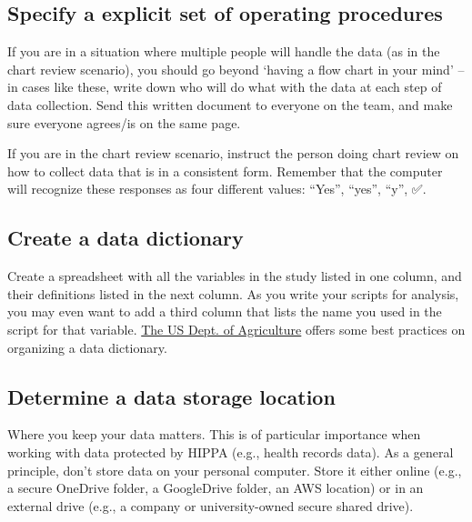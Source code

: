 \documentclass[
]{book}
\begin{document}
\hypertarget{specify-a-explicit-set-of-operating-procedures}{%
\subsection{Specify a explicit set of operating procedures}\label{specify-a-explicit-set-of-operating-procedures}}

If you are in a situation where multiple people will handle the data (as in the chart review scenario), you should go beyond `having a flow chart in your mind' -- in cases like these, write down who will do what with the data at each step of data collection. Send this written document to everyone on the team, and make sure everyone agrees/is on the same page.

If you are in the chart review scenario, instruct the person doing chart review on how to collect data that is in a consistent form. Remember that the computer will recognize these responses as four different values: ``Yes'', ``yes'', ``y'', ✅.

\hypertarget{create-a-data-dictionary}{%
\subsection{Create a data dictionary}\label{create-a-data-dictionary}}

Create a spreadsheet with all the variables in the study listed in one column, and their definitions listed in the next column. As you write your scripts for analysis, you may even want to add a third column that lists the name you used in the script for that variable. \href{https://data.nal.usda.gov/manually-creating-data-dictionary}{The US Dept. of Agriculture} offers some best practices on organizing a data dictionary.

\hypertarget{determine-a-data-storage-location}{%
\subsection{Determine a data storage location}\label{determine-a-data-storage-location}}

Where you keep your data matters. This is of particular importance when working with data protected by HIPPA (e.g., health records data). As a general principle, don't store data on your personal computer. Store it either online (e.g., a secure OneDrive folder, a GoogleDrive folder, an AWS location) or in an external drive (e.g., a company or university-owned secure shared drive).
\end{document}
